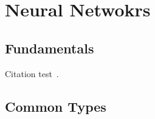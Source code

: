 
\chapter{Neural Netwokrs}\label{chapter:Related Work}

\section{Fundamentals}
Citation test~\parencite{latex}.

\section{Common Types}
